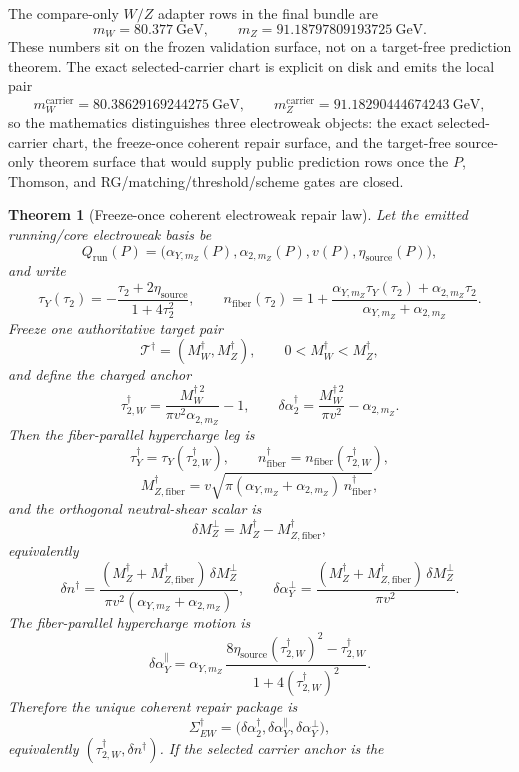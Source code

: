 \documentclass[11pt]{article}
\newtheorem{theorem}{Theorem}[section]
\begin{document}
The compare-only \(W/Z\) adapter rows in the final bundle are
\[
m_W = 80.377~\mathrm{GeV},
\qquad
m_Z = 91.18797809193725~\mathrm{GeV}.
\]
These numbers sit on the frozen validation surface, not on a target-free prediction theorem.
The exact selected-carrier chart is explicit on disk and emits
the local pair
\[
m_W^{\mathrm{carrier}} = 80.38629169244275~\mathrm{GeV},
\qquad
m_Z^{\mathrm{carrier}} = 91.18290444674243~\mathrm{GeV},
\]
so the mathematics distinguishes three electroweak objects: the exact selected-carrier chart, the
freeze-once coherent repair surface, and the target-free source-only theorem surface that would supply
public prediction rows once the \(P\), Thomson, and RG/matching/threshold/scheme gates are closed.

\begin{theorem}[Freeze-once coherent electroweak repair law]
Let the emitted running/core electroweak basis be
\[
Q_{\mathrm{run}}(P)=
\bigl(\alpha_{Y,m_Z}(P),\alpha_{2,m_Z}(P),v(P),\eta_{\mathrm{source}}(P)\bigr),
\]
and write
\[
\tau_Y(\tau_2)
=
-\frac{\tau_2+2\eta_{\mathrm{source}}}{1+4\tau_2^2},
\qquad
n_{\mathrm{fiber}}(\tau_2)
=
1+\frac{\alpha_{Y,m_Z}\tau_Y(\tau_2)+\alpha_{2,m_Z}\tau_2}
{\alpha_{Y,m_Z}+\alpha_{2,m_Z}}.
\]
Freeze one authoritative target pair
\[
\mathcal T^\dagger=(M_W^\dagger,M_Z^\dagger),
\qquad 0<M_W^\dagger<M_Z^\dagger,
\]
and define the charged anchor
\[
\tau_{2,W}^\dagger
=
\frac{M_W^{\dagger\,2}}{\pi v^2\alpha_{2,m_Z}}-1,
\qquad
\delta\alpha_2^\dagger
=
\frac{M_W^{\dagger\,2}}{\pi v^2}-\alpha_{2,m_Z}.
\]
Then the fiber-parallel hypercharge leg is
\[
\tau_Y^\dagger=\tau_Y(\tau_{2,W}^\dagger),
\qquad
n_{\mathrm{fiber}}^\dagger=n_{\mathrm{fiber}}(\tau_{2,W}^\dagger),
\]
\[
M_{Z,\mathrm{fiber}}^\dagger
=
v\sqrt{\pi(\alpha_{Y,m_Z}+\alpha_{2,m_Z})\,n_{\mathrm{fiber}}^\dagger},
\]
and the orthogonal neutral-shear scalar is
\[
\delta M_Z^\perp=M_Z^\dagger-M_{Z,\mathrm{fiber}}^\dagger,
\]
equivalently
\[
\delta n^\dagger
=
\frac{(M_Z^\dagger+M_{Z,\mathrm{fiber}}^\dagger)\,\delta M_Z^\perp}
{\pi v^2(\alpha_{Y,m_Z}+\alpha_{2,m_Z})},
\qquad
\delta\alpha_Y^\perp
=
\frac{(M_Z^\dagger+M_{Z,\mathrm{fiber}}^\dagger)\,\delta M_Z^\perp}{\pi v^2}.
\]
The fiber-parallel hypercharge motion is
\[
\delta\alpha_Y^\parallel
=
\alpha_{Y,m_Z}\,
\frac{8\eta_{\mathrm{source}}(\tau_{2,W}^\dagger)^2-\tau_{2,W}^\dagger}
{1+4(\tau_{2,W}^\dagger)^2}.
\]
Therefore the unique coherent repair package is
\[
\Sigma_{EW}^\dagger
=
\bigl(\delta\alpha_2^\dagger,\delta\alpha_Y^\parallel,\delta\alpha_Y^\perp\bigr),
\]
equivalently \((\tau_{2,W}^\dagger,\delta n^\dagger)\). If the selected carrier anchor is the

\end{theorem}
\end{document}
